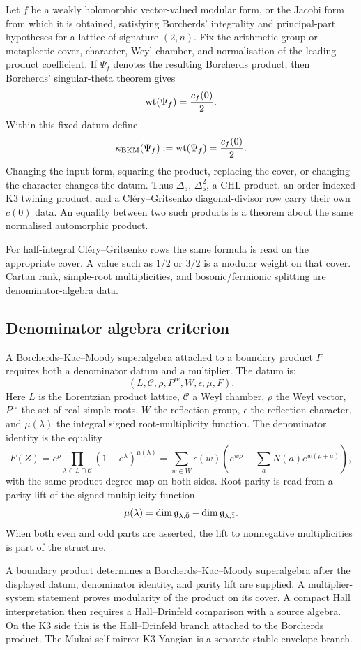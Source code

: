 Let $f$ be a weakly holomorphic vector-valued modular form, or the
Jacobi form from which it is obtained, satisfying Borcherds' integrality
and principal-part hypotheses for a lattice of signature $(2,n)$.  Fix
the arithmetic group or metaplectic cover, character, Weyl chamber, and
normalisation of the leading product coefficient.  If $\Psi_f$ denotes
the resulting Borcherds product, then Borcherds' singular-theta theorem
gives
\[
  \mathrm{wt}(\Psi_f)=\frac{c_f(0)}{2}.
\]
Within this fixed datum define
\[
  \kappa_{\mathrm{BKM}}(\Psi_f):=\mathrm{wt}(\Psi_f)=\frac{c_f(0)}{2}.
\]
Changing the input form, squaring the product, replacing the cover, or
changing the character changes the datum.  Thus $\Delta_5$,
$\Delta_5^2$, a CHL product, an order-indexed K3 twining product, and a
Cl\'ery--Gritsenko diagonal-divisor row carry their own $c(0)$ data.
An equality between two such products is a theorem about the same
normalised automorphic product.

For half-integral Cl\'ery--Gritsenko rows the same formula is read on
the appropriate cover.  A value such as $1/2$ or $3/2$ is a modular
weight on that cover.  Cartan rank, simple-root multiplicities, and
bosonic/fermionic splitting are denominator-algebra data.

\subsection*{Denominator algebra criterion}

A Borcherds--Kac--Moody superalgebra attached to a boundary product
$F$ requires both a denominator datum and a multiplier.  The datum is:
\[
  (L,\mathcal C,\rho,P^{\mathrm{re}},W,\epsilon,\mu,F).
\]
Here $L$ is the Lorentzian product lattice, $\mathcal C$ a Weyl chamber,
$\rho$ the Weyl vector, $P^{\mathrm{re}}$ the set of real simple roots,
$W$ the reflection group, $\epsilon$ the reflection character, and
$\mu(\lambda)$ the integral signed root-multiplicity function.  The
denominator identity is the equality
\[
  F(Z)=e^\rho
  \prod_{\lambda\in L\cap\mathcal C}
  (1-e^\lambda)^{\mu(\lambda)}
  =
  \sum_{w\in W}\epsilon(w)\left(
    e^{w\rho}+\sum_a N(a)e^{w(\rho+a)}
  \right),
\]
with the same product-degree map on both sides.  Root parity is read
from a parity lift of the signed multiplicity function
\[
  \mu(\lambda)
  =\dim \mathfrak{g}_{\lambda,\bar 0}-\dim \mathfrak{g}_{\lambda,\bar 1}.
\]
When both even and odd parts are asserted, the lift to nonnegative
multiplicities is part of the structure.

A boundary product determines a Borcherds--Kac--Moody superalgebra after
the displayed datum, denominator identity, and parity lift are supplied.
A multiplier-system statement proves modularity of the product on its
cover.  A compact Hall interpretation then requires a Hall--Drinfeld
comparison with a source algebra.  On the K3 side this is the
Hall--Drinfeld branch attached to the Borcherds product.  The Mukai
self-mirror K3 Yangian is a separate stable-envelope branch.

